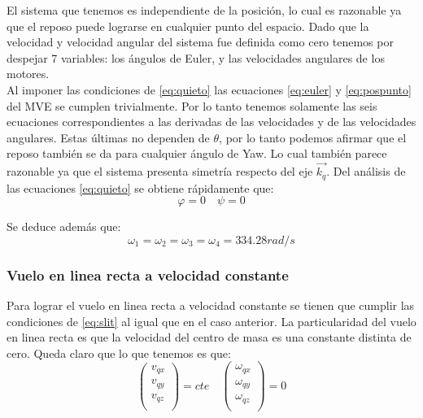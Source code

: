 \documentclass[main]{subfiles}
\begin{document}
El sistema que tenemos es independiente de la posici\'on, lo cual es razonable ya que el reposo puede lograrse en cualquier punto del espacio. Dado que la velocidad y velocidad angular del sistema fue definida como cero tenemos por despejar 7 variables: los \'angulos de Euler, y las velocidades angulares de los motores. \\

Al imponer las condiciones de \ref{eq:quieto} las ecuaciones \ref{eq:euler} y \ref{eq:pospunto} del MVE se cumplen trivialmente. Por lo tanto tenemos solamente las seis ecuaciones correspondientes a las derivadas de las velocidades y de las velocidades angulares. Estas \'ultimas  no dependen de $\theta$, por lo tanto podemos afirmar que el reposo tambi\'en se da para cualquier \'angulo de Yaw. Lo cual tambi\'en parece razonable ya que el sistema presenta simetr\'ia respecto del eje $\vec{k_q}$.
Del an\'alisis de las ecuaciones \ref{eq:quieto} se obtiene r\'apidamente que:
\begin{equation}
\varphi=0 \quad \psi=0
\end{equation}

Se deduce adem\'as que:
\begin{equation}
\omega_1=\omega_2=\omega_3=\omega_4=334.28 rad/s
\end{equation}

\subsubsection{Vuelo en linea recta a velocidad constante}

Para lograr el vuelo en linea recta a velocidad constante se tienen que cumplir las condiciones de \ref{eq:slit} al igual que en el caso anterior. La particularidad del vuelo en linea recta es que la velocidad del centro de masa es una constante distinta de cero. Queda claro que lo que tenemos es que:
\begin{equation}
\label{eq:recta}
\left(\begin{array}{c}
v_{qx}\\
v_{qy}\\
v_{qz}\\
\end{array}\right)=cte \quad
\left(\begin{array}{c}
\omega_{qx}\\
\omega_{qy}\\
\omega_{qz}\\
\end{array}\right)=0
\end{equation}
\end{document}
